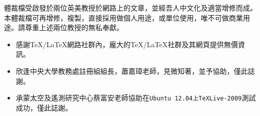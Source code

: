 \begin{acknowledgements} 

體裁檔受啟發於兩位英美教授於網路上的文章，並經吾人中文化及適當增修而成。本體裁檔可再增修，複製，直接採用做個人用途，或單位使用，唯不可做商業用途。請尊重上述兩位教授的無私奉獻。

\begin{itemize}
\item 感謝\TeX/\LaTeX{}網路社群內，龐大的\TeX/\LaTeX 社群及其網頁提供無價資訊。
\item 欣逢中央大學教務處註冊組組長，蕭嘉璋老師，見微知著，並予協助，僅此誌謝。
\item 承蒙太空及遙測研究中心蔡富安老師協助在{\tt Ubuntu 12.04上TeXLive-2009}測試成功，僅此誌謝。
\end{itemize}
\end{acknowledgements} 